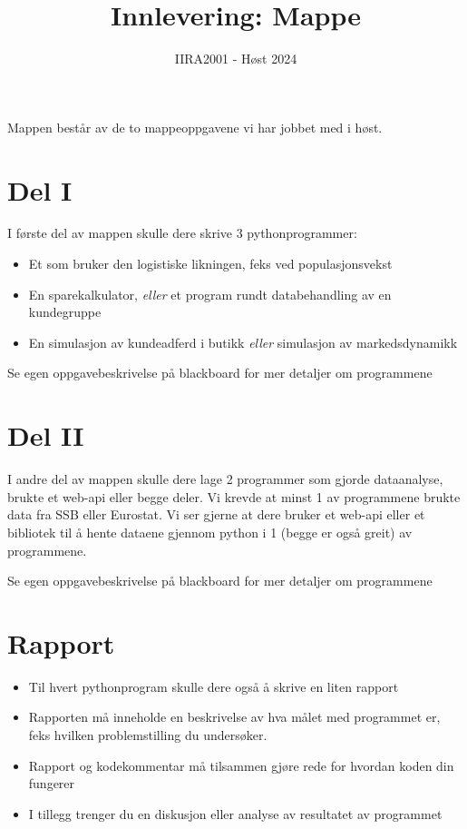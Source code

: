 \documentclass[12pt, titlepage]{article}
\begin{document}
\title{Innlevering: Mappe}
\author{IIRA2001 - Høst 2024}
\date{}
\maketitle

Mappen består av de to mappeoppgavene vi har jobbet med i høst.

\section*{Del I}

I første del av mappen skulle dere skrive 3 pythonprogrammer:
\begin{itemize}
   \item {Et som bruker den logistiske likningen, feks ved populasjonsvekst}
   \item {En sparekalkulator, \textit{eller} et program rundt databehandling av en kundegruppe}
   \item {En simulasjon av kundeadferd i butikk \textit{eller} simulasjon av markedsdynamikk}
\end{itemize}

Se egen oppgavebeskrivelse på blackboard for mer detaljer om programmene

\section*{Del II}

I andre del av mappen skulle dere lage 2 programmer som gjorde dataanalyse, brukte et web-api eller begge deler.
Vi krevde at minst 1 av programmene brukte data fra SSB eller Eurostat. Vi ser gjerne at dere bruker et web-api eller et bibliotek til å hente dataene gjennom python i 1 (begge er også greit) av programmene.

Se egen oppgavebeskrivelse på blackboard for mer detaljer om programmene


\section*{Rapport}

\begin{itemize}
   \item{Til hvert pythonprogram skulle dere også å skrive en liten rapport}
   \item {Rapporten må inneholde en beskrivelse av hva målet med programmet er, feks hvilken problemstilling du undersøker.}
   \item {Rapport og kodekommentar må tilsammen gjøre rede for hvordan koden din fungerer}
   \item {I tillegg trenger du en diskusjon eller analyse av resultatet av programmet}
\end{itemize}
\end{document}
